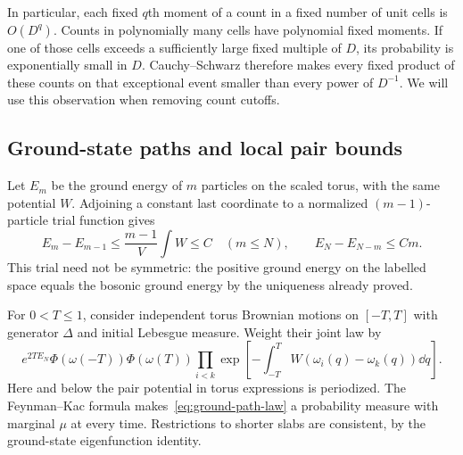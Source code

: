 In particular, each fixed $q$th moment of a count in a fixed number of
unit cells is $O(D^q)$. Counts in polynomially many cells have polynomial
fixed moments. If one of those cells exceeds a sufficiently large fixed
multiple of $D$, its probability is exponentially small in $D$.
Cauchy--Schwarz therefore makes every fixed product of these counts on
that exceptional event smaller than every power of $D^{-1}$. We will use
this observation when removing count cutoffs.

\subsection{Ground-state paths and local pair bounds}

Let $E_m$ be the ground energy of $m$ particles on the scaled torus,
with the same potential $W$. Adjoining a constant last coordinate to a
normalized $(m-1)$-particle trial function gives
\begin{equation}\label{eq:removal-energy}
 E_m-E_{m-1}\le\frac{m-1}{V}\int W\le C
 \quad(m\le N),\qquad E_N-E_{N-m}\le Cm.
\end{equation}
This trial need not be symmetric: the positive ground energy on the
labelled space equals the bosonic ground energy by the uniqueness already
proved.

For $0<T\le1$, consider independent torus Brownian motions on $[-T,T]$
with generator $\Delta$ and initial Lebesgue measure. Weight their joint
law by
\begin{equation}\label{eq:ground-path-law}
 e^{2TE_N}\Phi(\omega(-T))\Phi(\omega(T))
 \prod_{i<k}\exp\left[-\int_{-T}^T
              W(\omega_i(q)-\omega_k(q))\dd q\right].
\end{equation}
Here and below the pair potential in torus expressions is periodized.
The Feynman--Kac formula makes~\eqref{eq:ground-path-law} a probability
measure with marginal $\mu$ at every time. Restrictions to shorter slabs
are consistent, by the ground-state eigenfunction identity.

